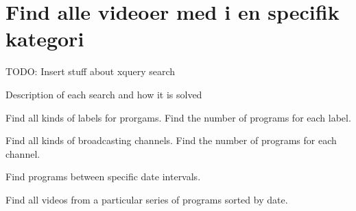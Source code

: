 \section{Find alle videoer med i en specifik kategori}


TODO: Insert stuff about xquery search

Description of each search and how it is solved

Find all kinds of labels for prorgams.
Find the number of programs for each label.

Find all kinds of broadcasting channels.
Find the number of programs for each channel.

Find programs between specific date intervals.

Find all videos from a particular series of programs sorted by date.

